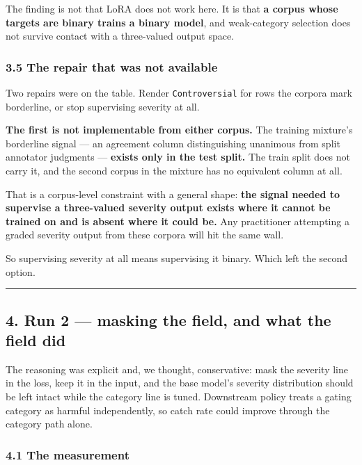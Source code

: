 The finding is not that LoRA does not work here. It is that \textbf{a corpus whose targets are binary
trains a binary model}, and weak-category selection does not survive contact with a three-valued
output space.

\subsubsection{3.5 The repair that was not available}\label{the-repair-that-was-not-available}

Two repairs were on the table. Render \texttt{Controversial} for rows the corpora mark borderline, or stop
supervising severity at all.

\textbf{The first is not implementable from either corpus.} The training mixture's borderline signal --- an
agreement column distinguishing unanimous from split annotator judgments --- \textbf{exists only in the test
split.} The train split does not carry it, and the second corpus in the mixture has no equivalent
column at all.

That is a corpus-level constraint with a general shape: \textbf{the signal needed to supervise a
three-valued severity output exists where it cannot be trained on and is absent where it could be.}
Any practitioner attempting a graded severity output from these corpora will hit the same wall.

So supervising severity at all means supervising it binary. Which left the second option.

\begin{center}\rule{0.5\linewidth}{0.5pt}\end{center}

\subsection{4. Run 2 --- masking the field, and what the field did}\label{run-2-masking-the-field-and-what-the-field-did}

The reasoning was explicit and, we thought, conservative: mask the severity line in the loss, keep it
in the input, and the base model's severity distribution should be left intact while the category
line is tuned. Downstream policy treats a gating category as harmful independently, so catch rate
could improve through the category path alone.

\subsubsection{4.1 The measurement}\label{the-measurement}

